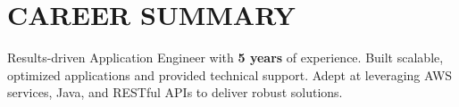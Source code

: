 \section{CAREER SUMMARY}
\begin{onecolentry}
    Results-driven Application Engineer with \textbf{5 years} of experience. Built scalable, optimized applications and provided technical support. Adept at leveraging AWS services, Java, and RESTful APIs to deliver robust solutions.
\end{onecolentry}
